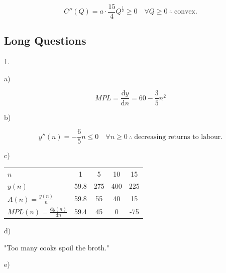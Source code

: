 \documentclass{article}
\newcommand{\dd}[1]{\mathrm{d}#1}
\begin{document}
$$
  C''(Q) = a\cdot\frac{15}{4}Q^{\frac{1}{2}} \geq 0 \quad \forall Q \geq 0 \: \therefore \: \text{convex}.
$$

\clearpage

\subsection{Long Questions}

\noindent

1.

a)

$$
  MPL = \frac{\dd y}{\dd n} = 60 - \frac{3}{5}n^2
$$

b)

$$
  y''(n) = -\frac{6}{5}n \leq 0 \quad \forall n \geq 0 \: \therefore \: \text{decreasing returns to labour.}
$$

c)

\begin{center}
  \begin{tabular}{l c c c c}
    $n$ & 1 & 5 & 10 & 15 \\
    $y(n)$ & 59.8 & 275 & 400 & 225 \\
    $A(n) = \frac{y(n)}{n}$ & 59.8 & 55 & 40 & 15 \\
    $MPL(n) = \frac{\dd y(n)}{\dd n}$ & 59.4 & 45 & 0 & -75
  \end{tabular}
\end{center}

d)

"Too many cooks spoil the broth."

e)
\end{document}
